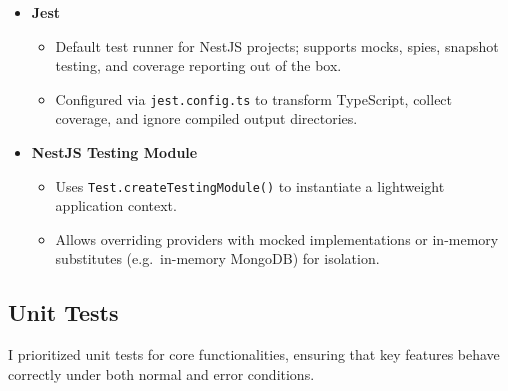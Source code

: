 \begin{itemize}
  \item \textbf{Jest}  
    \begin{itemize}
      \item Default test runner for NestJS projects; supports mocks, spies, snapshot testing, and coverage reporting out of the box.
      \item Configured via \texttt{jest.config.ts} to transform TypeScript, collect coverage, and ignore compiled output directories.
    \end{itemize}

  \item \textbf{NestJS Testing Module}  
    \begin{itemize}
      \item Uses \texttt{Test.createTestingModule()} to instantiate a lightweight application context.
      \item Allows overriding providers with mocked implementations or in-memory substitutes (e.g.\ in-memory MongoDB) for isolation.
    \end{itemize}
\end{itemize}

\subsection{Unit Tests}

I prioritized unit tests for core functionalities, ensuring that key features behave correctly under both normal and error conditions.

